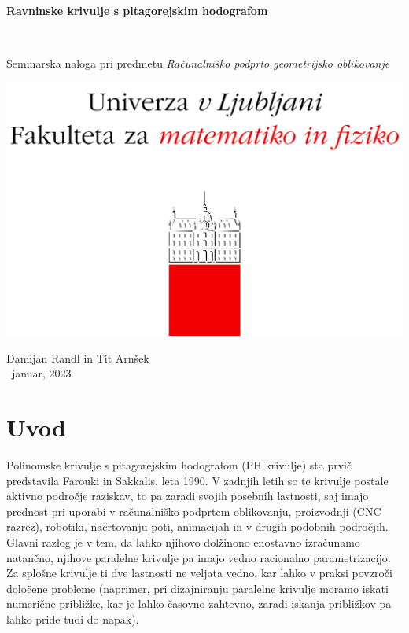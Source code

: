 \documentclass[12pt]{article}
\begin{document}
\thispagestyle{empty}
\begin{center}
\begin{Large}
{\bf Ravninske krivulje s pitagorejskim hodografom}
\end{Large}
\\[5mm]
\begin{large}
Seminarska naloga pri predmetu {\em Računalniško podprto geometrijsko oblikovanje }
\\[5mm]
\begin{center}
	\includegraphics{fmf.png}	
\end{center}
\vspace*{\fill}

{\sc Damijan Randl in Tit Arnšek}
\\[10mm]
~januar, 2023
\end{large}

\end{center}

\newpage
\thispagestyle{empty}
\tableofcontents

\newpage
\setcounter{page}{1}

\section{Uvod}
Polinomske krivulje s pitagorejskim hodografom (PH krivulje) sta prvič predstavila Farouki in Sakkalis, leta 1990.
V zadnjih letih so te krivulje postale aktivno področje raziskav,
to pa zaradi svojih posebnih lastnosti, 
saj imajo prednost pri uporabi v računalniško podprtem oblikovanju,
proizvodnji (CNC razrez), robotiki, načrtovanju poti, animacijah in v drugih 
podobnih področjih. Glavni razlog je v tem, da lahko njihovo dolžinono enostavno izračunamo natančno,
njihove paralelne krivulje pa imajo vedno racionalno parametrizacijo.
\newline
Za splošne krivulje ti dve lastnosti ne veljata vedno, 
kar lahko v praksi povzroči določene probleme (naprimer, pri dizajniranju paralelne krivulje 
moramo iskati numerične približke, kar je lahko časovno zahtevno,
zaradi iskanja približkov pa lahko pride tudi do napak).
\end{document}
